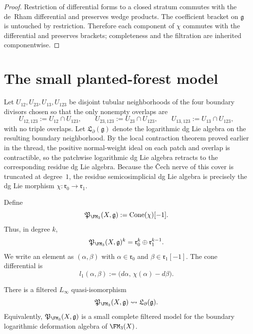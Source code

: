 \begin{proof}
Restriction of differential forms to a closed stratum commutes with the de~Rham
differential and preserves wedge products.  The coefficient bracket on
$\mathfrak g$ is untouched by restriction.  Therefore each component of $\chi$
commutes with the differential and preserves brackets; completeness and the
filtration are inherited componentwise.
\end{proof}

\section{The small planted-forest model}
\label{sec:fm3-small-model}

Let $U_{12},U_{23},U_{13},U_{123}$ be disjoint tubular neighborhoods of the four
boundary divisors chosen so that the only nonempty overlaps are
\[
U_{12,123}:=U_{12}\cap U_{123},
\qquad
U_{23,123}:=U_{23}\cap U_{123},
\qquad
U_{13,123}:=U_{13}\cap U_{123},
\]
with no triple overlaps.  Let $\mathfrak{L}_\partial(\mathfrak g)$ denote the
logarithmic dg Lie algebra on the resulting boundary neighborhood.
By the local contraction theorem proved earlier in the thread, the positive
normal-weight ideal on each patch and overlap is contractible, so the patchwise
logarithmic dg Lie algebra retracts to the corresponding residue dg Lie algebra.
Because the \v{C}ech nerve of this cover is truncated at degree~$1$, the
residue semicosimplicial dg Lie algebra is precisely the dg Lie morphism
$\chi\colon \mathfrak r_0\to \mathfrak r_1$.

\begin{definition}
\label{def:fm3-planted-forest-complex}
Define
\[
\mathfrak{P}_{\FM_3}(X,\mathfrak g) := \operatorname{Cone}(\chi)[-1].
\]
Thus, in degree $k$,
\[
\mathfrak{P}_{\FM_3}(X,\mathfrak g)^k
=
\mathfrak r_0^k \oplus \mathfrak r_1^{k-1}.
\]
We write an element as $(\alpha,\beta)$ with
$\alpha\in \mathfrak r_0$ and $\beta\in \mathfrak r_1[-1]$.
The cone differential is
\begin{equation}
\label{eq:l1-fm3-cone}
 l_1(\alpha,\beta) := \bigl(d\alpha,\, \chi(\alpha)-d\beta\bigr).
\end{equation}
\end{definition}

\begin{theorem}
\label{thm:fm3-homotopy-fiber}
There is a filtered $L_\infty$ quasi-isomorphism
\[
\mathfrak{P}_{\FM_3}(X,\mathfrak g)
\rightsquigarrow
\mathfrak{L}_\partial(\mathfrak g).
\]
Equivalently, $\mathfrak{P}_{\FM_3}(X,\mathfrak g)$ is a small complete filtered
model for the boundary logarithmic deformation algebra of $\FM_3(X)$.
\end{theorem}

